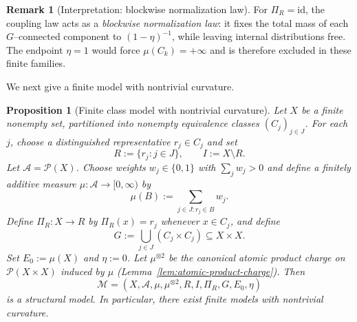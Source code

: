 \documentclass[11pt]{article}
\numberwithin{equation}{section}
\newtheorem{proposition}[theorem]{Proposition}
\theoremstyle{definition}
\newtheorem{remark}[theorem]{Remark}
\begin{document}
\begin{remark}[Interpretation: blockwise normalization law]\label{rem:block-norm}
For $\Pi_R=\mathrm{id}$, the coupling law acts as a \emph{blockwise normalization law}:
it fixes the total mass of each $G$--connected component to $(1-\eta)^{-1}$, while leaving internal distributions free.
The endpoint $\eta=1$ would force $\mu(C_k)=+\infty$ and is therefore excluded in these finite families.
\end{remark}


We next give a finite model with nontrivial curvature.

\begin{proposition}[Finite class model with nontrivial curvature]\label{prop:finite-class-model}
Let $X$ be a finite nonempty set, partitioned into nonempty equivalence classes
$(C_j)_{j\in J}$.
For each $j$, choose a distinguished representative $r_j\in C_j$ and set
\[
R := \{r_j : j\in J\},\qquad I := X\setminus R.
\]
Let $\mathcal A=\mathcal P(X)$.
Choose weights $w_j\in\{0,1\}$ with $\sum_j w_j>0$ and define a finitely additive measure
$\mu:\mathcal A\to[0,\infty)$ by
\[
\mu(B) := \sum_{j\in J : r_j\in B} w_j.
\]
Define $\Pi_R:X\to R$ by $\Pi_R(x)=r_j$ whenever $x\in C_j$, and define
\[
G := \bigcup_{j\in J} (C_j\times C_j)\subseteq X\times X.
\]
Set $E_0 := \mu(X)$ and $\eta:=0$.
Let $\mu^{\otimes2}$ be the canonical atomic product charge on $\mathcal P(X\times X)$ induced by $\mu$ (Lemma~\ref{lem:atomic-product-charge}).
Then
\[
\mathcal M=(X,\mathcal A,\mu,\mu^{\otimes2},R,I,\Pi_R,G,E_0,\eta)
\]
is a structural model.  In particular, there exist finite models with nontrivial curvature.
\end{proposition}
\end{document}
